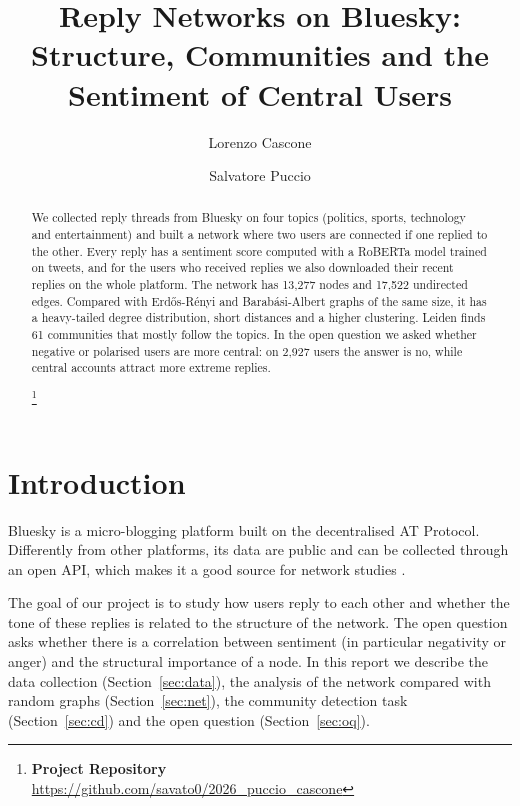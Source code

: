 \documentclass[sigchi]{acmart}
\begin{document}
\title[Reply Networks on Bluesky]{Reply Networks on Bluesky: Structure, Communities and the Sentiment of Central Users}

\author{Lorenzo Cascone}

\author{Salvatore Puccio}

\renewcommand{\shortauthors}{Cascone and Puccio}

\begin{abstract}
We collected reply threads from Bluesky on four topics (politics, sports, technology and entertainment) and built a network where two users are connected if one replied to the other. Every reply has a sentiment score computed with a RoBERTa model trained on tweets, and for the users who received replies we also downloaded their recent replies on the whole platform. The network has 13,277 nodes and 17,522 undirected edges. Compared with Erd\H{o}s-R\'enyi and Barab\'asi-Albert graphs of the same size, it has a heavy-tailed degree distribution, short distances and a higher clustering. Leiden finds 61 communities that mostly follow the topics. In the open question we asked whether negative or polarised users are more central: on 2,927 users the answer is no, while central accounts attract more extreme replies.

\footnote{
{\bf Project Repository}\\
\noindent \url{https://github.com/savato0/2026_puccio_cascone}}
\end{abstract}


\maketitle

\section{Introduction}
Bluesky is a micro-blogging platform built on the decentralised AT Protocol. Differently from other platforms, its data are public and can be collected through an open API, which makes it a good source for network studies \cite{failla2024bluesky}.

The goal of our project is to study how users reply to each other and whether the tone of these replies is related to the structure of the network. The open question asks whether there is a correlation between sentiment (in particular negativity or anger) and the structural importance of a node. In this report we describe the data collection (Section~\ref{sec:data}), the analysis of the network compared with random graphs (Section~\ref{sec:net}), the community detection task (Section~\ref{sec:cd}) and the open question (Section~\ref{sec:oq}).
\end{document}
